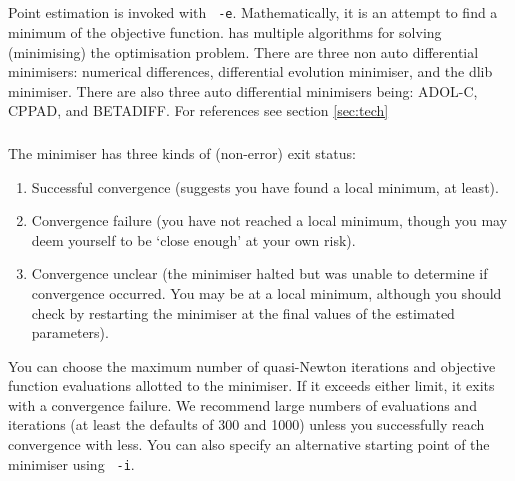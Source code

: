 
\subsection{\label{sec:estimate-MPD}}
Point estimation is invoked with \texttt{\cname\ -e}. Mathematically, it is an attempt to find a minimum of the objective function. \CNAME has multiple algorithms for solving (minimising) the optimisation problem. There are three non auto differential minimisers: numerical differences, differential evolution minimiser, and the dlib minimiser. There are also three auto differential minimisers being: ADOL-C, CPPAD, and BETADIFF. For references see section \ref{sec:tech}
\subsubsection{}

The minimiser has three kinds of (non-error) exit status: 

\begin{enumerate}
\item Successful convergence (suggests you have found a local minimum, at least).
\item Convergence failure (you have not reached a local minimum, though you may deem yourself to be `close enough' at your own risk).
\item Convergence unclear (the minimiser halted but was unable to determine if convergence occurred. You may be at a local minimum, although you should check by restarting the minimiser at the final values of the estimated parameters).
\end{enumerate}

You can choose the maximum number of quasi-Newton iterations and objective function evaluations allotted to the minimiser. If it exceeds either limit, it exits with a convergence failure. We recommend large numbers of evaluations and iterations (at least the defaults of 300 and 1000) unless you successfully reach convergence with less. You can also specify an alternative starting point of the minimiser using \texttt{\cname\ -i}.

